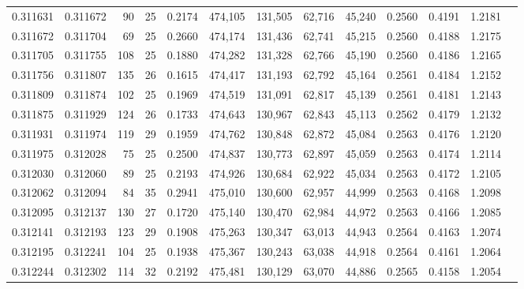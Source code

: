 \begin{tabular}{rrrrrrrrrrrrr}
0.311631 & 0.311672 &    90 &  25 &                                     0.2174 & 474,105 & 131,505 &  62,716 &  45,240 & 0.2560 & 0.4191 & 1.2181 \\
0.311672 & 0.311704 &    69 &  25 &                                     0.2660 & 474,174 & 131,436 &  62,741 &  45,215 & 0.2560 & 0.4188 & 1.2175 \\
0.311705 & 0.311755 &   108 &  25 &                                     0.1880 & 474,282 & 131,328 &  62,766 &  45,190 & 0.2560 & 0.4186 & 1.2165 \\
0.311756 & 0.311807 &   135 &  26 &                                     0.1615 & 474,417 & 131,193 &  62,792 &  45,164 & 0.2561 & 0.4184 & 1.2152 \\
0.311809 & 0.311874 &   102 &  25 &                                     0.1969 & 474,519 & 131,091 &  62,817 &  45,139 & 0.2561 & 0.4181 & 1.2143 \\
0.311875 & 0.311929 &   124 &  26 &                                     0.1733 & 474,643 & 130,967 &  62,843 &  45,113 & 0.2562 & 0.4179 & 1.2132 \\
0.311931 & 0.311974 &   119 &  29 &                                     0.1959 & 474,762 & 130,848 &  62,872 &  45,084 & 0.2563 & 0.4176 & 1.2120 \\
0.311975 & 0.312028 &    75 &  25 &                                     0.2500 & 474,837 & 130,773 &  62,897 &  45,059 & 0.2563 & 0.4174 & 1.2114 \\
0.312030 & 0.312060 &    89 &  25 &                                     0.2193 & 474,926 & 130,684 &  62,922 &  45,034 & 0.2563 & 0.4172 & 1.2105 \\
0.312062 & 0.312094 &    84 &  35 &                                     0.2941 & 475,010 & 130,600 &  62,957 &  44,999 & 0.2563 & 0.4168 & 1.2098 \\
0.312095 & 0.312137 &   130 &  27 &                                     0.1720 & 475,140 & 130,470 &  62,984 &  44,972 & 0.2563 & 0.4166 & 1.2085 \\
0.312141 & 0.312193 &   123 &  29 &                                     0.1908 & 475,263 & 130,347 &  63,013 &  44,943 & 0.2564 & 0.4163 & 1.2074 \\
0.312195 & 0.312241 &   104 &  25 &                                     0.1938 & 475,367 & 130,243 &  63,038 &  44,918 & 0.2564 & 0.4161 & 1.2064 \\
0.312244 & 0.312302 &   114 &  32 &                                     0.2192 & 475,481 & 130,129 &  63,070 &  44,886 & 0.2565 & 0.4158 & 1.2054 \\

\end{tabular}
